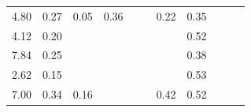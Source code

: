 \documentclass[10pt,a4paper]{article}
\begin{document}
\begin{table}
\begin{tabular}{@{}ccccccccccc@{}}
		4.80                                                         & 0.27                                                & 0.05                                                & 0.36                                                &                                                     &                                                      & 0.22                                                & 0.35                                                  &                                                         &                                                      & \cite{Seppala}                                  \\
		4.12                                                         & 0.20                                                &                                                     &                                                     &                                                     &                                                      &                                                     & 0.52                                                  &                                                         &                                                      & \cite{Alburquerque}                   \\
		7.84                                                         & 0.25                                                &                                                     &                                                     &                                                     &                                                      &                                                     & 0.38                                                  &                                                         &                                                      & \cite{Alburquerque}                             \\
		2.62                                                         & 0.15                                                &                                                     &                                                     &                                                     &                                                      &                                                     & 0.53                                                  &                                                         &                                                      & \cite{Alburquerque}                             \\
		7.00                                                         & 0.34                                                & 0.16                                                &                                                     &                                                     &                                                      & 0.42                                                & 0.52                                                  &                                                         &                                                      & \cite{Bolzonella}                            \\

\end{tabular}
\end{table}
\end{document}
